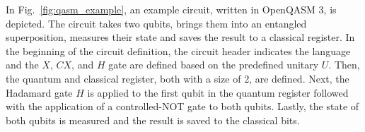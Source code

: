 In Fig.~\ref{fig:qasm_example}, an example circuit, written in OpenQASM 3, is depicted. The circuit takes two qubits, brings them into an entangled superposition, measures their state and saves the result to a classical register. In the beginning of the circuit definition, the circuit header indicates the language and the $X$, $CX$, and $H$ gate are defined based on the predefined unitary $U$. Then, the quantum and classical register, both with a size of 2, are defined. Next, the Hadamard gate $H$ is applied to the first qubit in the quantum register followed with the application of a controlled-NOT gate to both qubits. Lastly, the state of both qubits is measured and the result is saved to the classical bits.